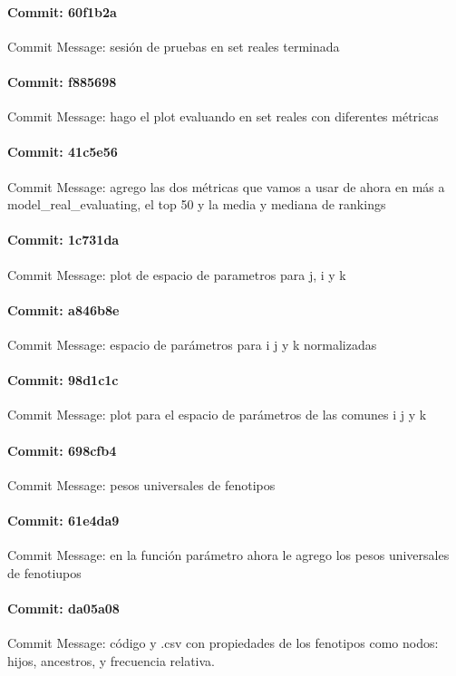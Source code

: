 \documentclass{article}
\begin{document}
\paragraph{Commit: 60f1b2a}
Commit Message: sesión de pruebas en set reales terminada

\paragraph{Commit: f885698}
Commit Message: hago el plot evaluando en set reales con diferentes métricas

\paragraph{Commit: 41c5e56}
Commit Message: agrego las dos métricas que vamos a usar de ahora en más a model_real_evaluating, el top 50 y la media y mediana de rankings

\paragraph{Commit: 1c731da}
Commit Message: plot de espacio de parametros para j, i y k

\paragraph{Commit: a846b8e}
Commit Message: espacio de parámetros para i j y k normalizadas

\paragraph{Commit: 98d1c1c}
Commit Message: plot para el espacio de parámetros de las comunes i j y k

\paragraph{Commit: 698cfb4}
Commit Message: pesos universales de fenotipos

\paragraph{Commit: 61e4da9}
Commit Message: en la función parámetro ahora le agrego los pesos universales de fenotiupos

\paragraph{Commit: da05a08}
Commit Message: código y .csv con propiedades de los fenotipos como nodos: hijos, ancestros, y frecuencia relativa.
\end{document}
